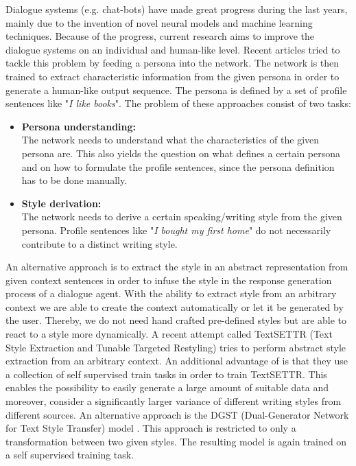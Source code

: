 \documentclass[twocolumn]{tum-article}
\begin{document}
Dialogue systems (e.g. chat-bots) have made great progress during the last years, mainly due to the invention of novel neural models and machine learning techniques. Because of the progress, current research aims to improve the dialogue systems on an individual and human-like level. Recent articles \cite{DBLP:journals/corr/abs-1901-08149, liu2020impress} tried to tackle this problem by feeding a persona into the network. The network is then trained to extract characteristic information from the given persona in order to generate a human-like output sequence. The persona is defined by a set of profile sentences like "\textit{I like books}". The problem of these approaches consist of two tasks:
\begin{itemize}
\item \textbf{Persona understanding:}\\
The network needs to understand what the characteristics of the given persona are. This also yields the question on what defines a certain persona and on how to formulate the profile sentences, since the persona definition has to be done manually. 
\item \textbf{Style derivation:}\\
The network needs to derive a certain speaking/writing style from the given persona. Profile sentences like "\textit{I bought my first home}" \cite{liu2020impress} do not necessarily contribute to a distinct writing style.
\end{itemize}
An alternative approach is to extract the style in an abstract representation from given context sentences in order to infuse the style in the response generation process of a dialogue agent. With the ability to extract style from an arbitrary context we are able to create the context automatically or let it be generated by the user. Thereby, we do not need hand crafted pre-defined styles but are able to react to a style more dynamically. A recent attempt called TextSETTR (Text Style Extraction and Tunable Targeted Restyling) \cite{riley2020textsettr} tries to perform abstract style extraction from an arbitrary context. An additional advantage of \cite{riley2020textsettr} is that they use a collection of self supervised train tasks in order to train TextSETTR. This enables the possibility to easily generate a large amount of suitable data and moreover, consider a significantly larger variance of different writing styles from different sources. 
An alternative approach is the DGST (Dual-Generator Network for Text Style Transfer) model \cite{li2020dgst}. This approach is restricted to only a transformation between two given styles. The resulting model is again trained on a self supervised training task.\\
\end{document}
